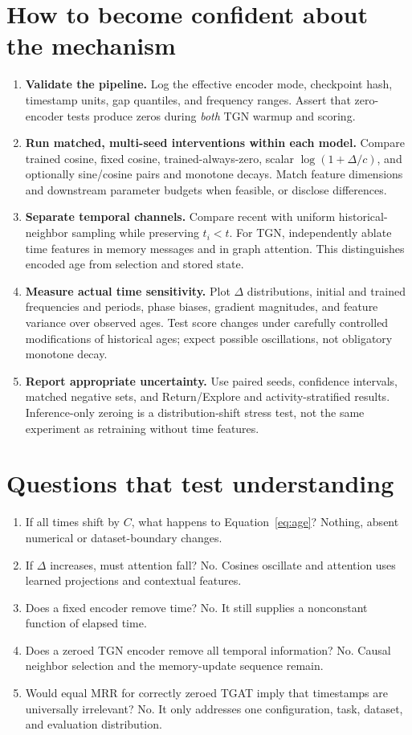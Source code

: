 \documentclass[11pt]{article}
\begin{document}
\section{How to become confident about the mechanism}
\begin{enumerate}
\item \textbf{Validate the pipeline.} Log the effective encoder mode, checkpoint hash, timestamp units, gap quantiles, and frequency ranges. Assert that zero-encoder tests produce zeros during \emph{both} TGN warmup and scoring.
\item \textbf{Run matched, multi-seed interventions within each model.} Compare trained cosine, fixed cosine, trained-always-zero, scalar $\log(1+\Delta/c)$, and optionally sine/cosine pairs and monotone decays. Match feature dimensions and downstream parameter budgets when feasible, or disclose differences.
\item \textbf{Separate temporal channels.} Compare recent with uniform historical-neighbor sampling while preserving $t_i<t$. For TGN, independently ablate time features in memory messages and in graph attention. This distinguishes encoded age from selection and stored state.
\item \textbf{Measure actual time sensitivity.} Plot $\Delta$ distributions, initial and trained frequencies and periods, phase biases, gradient magnitudes, and feature variance over observed ages. Test score changes under carefully controlled modifications of historical ages; expect possible oscillations, not obligatory monotone decay.
\item \textbf{Report appropriate uncertainty.} Use paired seeds, confidence intervals, matched negative sets, and Return/Explore and activity-stratified results. Inference-only zeroing is a distribution-shift stress test, not the same experiment as retraining without time features.
\end{enumerate}

\section{Questions that test understanding}
\begin{enumerate}
\item If all times shift by $C$, what happens to Equation~\eqref{eq:age}? Nothing, absent numerical or dataset-boundary changes.
\item If $\Delta$ increases, must attention fall? No. Cosines oscillate and attention uses learned projections and contextual features.
\item Does a fixed encoder remove time? No. It still supplies a nonconstant function of elapsed time.
\item Does a zeroed TGN encoder remove all temporal information? No. Causal neighbor selection and the memory-update sequence remain.
\item Would equal MRR for correctly zeroed TGAT imply that timestamps are universally irrelevant? No. It only addresses one configuration, task, dataset, and evaluation distribution.
\end{enumerate}
\end{document}
